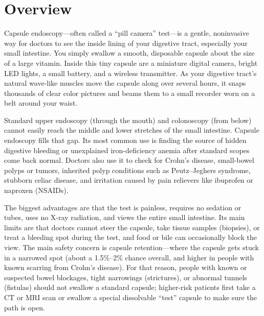 \label{ch:infographic-capsule-endoscopy}

\section{Overview}

Capsule endoscopy---often called a ``pill camera'' test---is a gentle, noninvasive way for doctors to see the inside lining of your digestive tract, especially your small intestine. You simply swallow a smooth, disposable capsule about the size of a large vitamin. Inside this tiny capsule are a miniature digital camera, bright LED lights, a small battery, and a wireless transmitter. As your digestive tract's natural wave-like muscles move the capsule along over several hours, it snaps thousands of clear color pictures and beams them to a small recorder worn on a belt around your waist.

Standard upper endoscopy (through the mouth) and colonoscopy (from below) cannot easily reach the middle and lower stretches of the small intestine. Capsule endoscopy fills that gap. Its most common use is finding the source of hidden digestive bleeding or unexplained iron-deficiency anemia after standard scopes come back normal. Doctors also use it to check for Crohn's disease, small-bowel polyps or tumors, inherited polyp conditions such as Peutz--Jeghers syndrome, stubborn celiac disease, and irritation caused by pain relievers like ibuprofen or naproxen (NSAIDs).

The biggest advantages are that the test is painless, requires no sedation or tubes, uses no X-ray radiation, and views the entire small intestine. Its main limits are that doctors cannot steer the capsule, take tissue samples (biopsies), or treat a bleeding spot during the test, and food or bile can occasionally block the view. The main safety concern is capsule retention---where the capsule gets stuck in a narrowed spot (about a 1.5\%--2\% chance overall, and higher in people with known scarring from Crohn's disease). For that reason, people with known or suspected bowel blockages, tight narrowings (strictures), or abnormal tunnels (fistulas) should not swallow a standard capsule; higher-risk patients first take a CT or MRI scan or swallow a special dissolvable ``test'' capsule to make sure the path is open.

